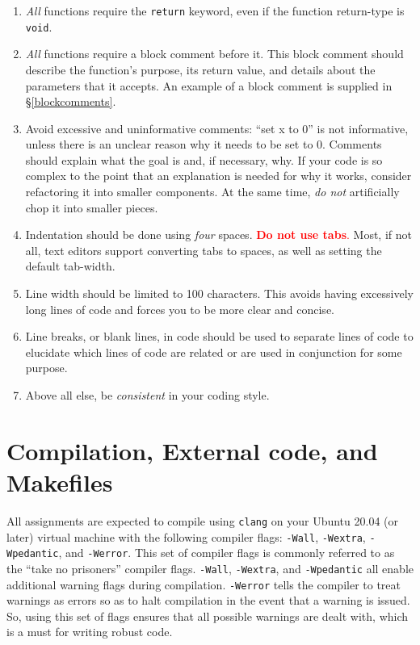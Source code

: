 \documentclass[11pt]{article}
\begin{document}
\begin{enumerate}
  \item \emph{All} functions require the \texttt{return} keyword, even if the function
    return-type is \texttt{void}.

  \item \emph{All} functions require a block comment before it. This
    block comment should describe the function's purpose, its return
    value, and details about the parameters that it accepts. An example
    of a block comment is supplied in \S\ref{blockcomments}.

  \item Avoid excessive and uninformative comments: ``set x to 0'' is not
    informative, unless there is an unclear reason why it needs to be set to 0.
    Comments should explain what the goal is and, if necessary, why.  If your
    code is so complex to the point that an explanation is needed for why it
    works, consider refactoring it into smaller components. At the same time, \emph{do not}
    artificially chop it into smaller pieces.

  \item Indentation should be done using \emph{four} spaces.
    \textcolor{red}{\textbf{Do not use tabs}.} Most, if not all, text
    editors support converting tabs to spaces, as well as setting the
    default tab-width.

  \item Line width should be limited to 100 characters. This avoids having
    excessively long lines of code and forces you to be more clear and concise.

  \item Line breaks, or blank lines, in code should be used to separate lines of
    code to elucidate which lines of code are related or are used in conjunction
    for some purpose.

  \item Above all else, be \emph{consistent} in your coding style.
\end{enumerate}


\section{Compilation, External code, and Makefiles}

All assignments are expected to compile using \texttt{clang} on your
Ubuntu 20.04 (or later) virtual machine with the following compiler
flags: \texttt{-Wall}, \texttt{-Wextra}, \texttt{-Wpedantic}, and
\texttt{-Werror}. This set of compiler flags is commonly referred to as
the ``take no prisoners'' compiler flags. \texttt{-Wall},
\texttt{-Wextra}, and \texttt{-Wpedantic} all enable additional warning
flags during compilation. \texttt{-Werror} tells the compiler to treat
warnings as errors so as to halt compilation in the event that a warning
is issued. So, using this set of flags ensures that all possible warnings
are dealt with, which is a must for writing robust code.
\end{document}
